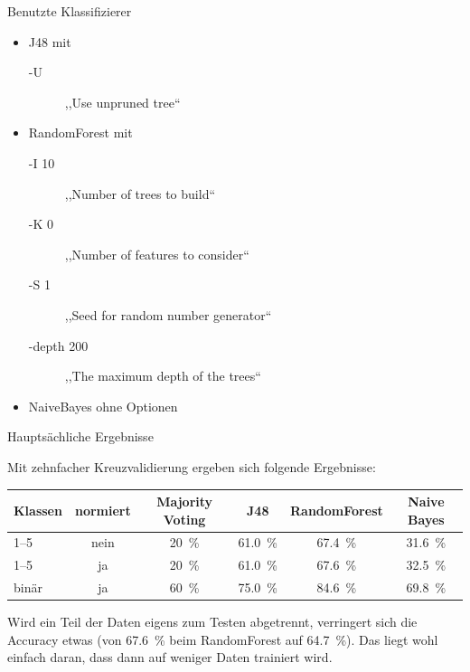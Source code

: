 \documentclass[note=hide]{beamer} %
\begin{document}
\begin{frame}{Benutzte Klassifizierer}
	\begin{itemize}
		\item J48 mit 
			\begin{description}
				\item[-U] ,,Use unpruned tree``
			\end{description}
		\item RandomForest mit 
			\begin{description}
				\item[-I 10] ,,Number of trees to build``
				\item[-K 0] ,,Number of features to consider``
				\item[-S 1] ,,Seed for random number generator``
				\item[-depth 200] ,,The maximum depth of the trees``
			\end{description}
		\item NaiveBayes ohne Optionen
	\end{itemize}
\end{frame}

\begin{frame}{Hauptsächliche Ergebnisse}

	Mit zehnfacher Kreuzvalidierung ergeben sich folgende Ergebnisse:

	{
		\begin{tabular}{lccccc}
			\toprule
			Klassen & normiert & Majority Voting & J48 & RandomForest & Naive Bayes \\
			\midrule
			1--5 & nein & \SI{20}{\%} &\SI{61.0}{\%} & \SI{67.4}{\%} & \SI{31.6}{\%} \\
			1--5 & ja & \SI{20}{\%} &\SI{61.0}{\%} & \alert{\SI{67.6}{\%}} & \SI{32.5}{\%} \\
			binär & ja & \SI{60}{\%} & \SI{75.0}{\%} & \SI{84.6}{\%} & \SI{69.8}{\%} \\
			\bottomrule
		\end{tabular}
	}
	Wird ein Teil der Daten eigens zum Testen abgetrennt, verringert sich die Accuracy etwas (von \SI{67.6}{\%} beim RandomForest auf \SI{64.7}{\%}).
	Das liegt wohl einfach daran, dass dann auf weniger Daten trainiert wird.
	
\end{frame}
\end{document}
